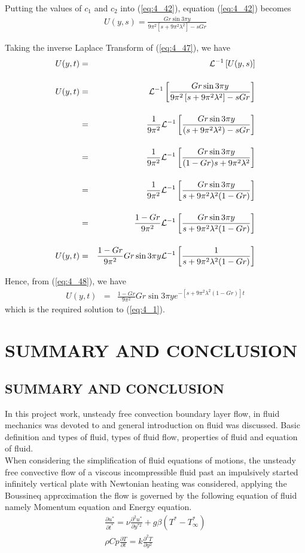 \documentclass[11pt]{report}
\newcommand{\spn}[1]{\\[#1cm]}
\newcommand{\refn}[1]{(\ref{#1})}
\newcommand{\refx}[1]{\refn{eq:#1}}
\newcommand{\NI}{\noindent}
\newcommand{\Laplace}{\mathcal{L}}
\newcommand{\InverseL}[1]{\Laplace^{-1}\left[#1\right]}
\newcommand{\Lpt}{Laplace Transform }
\begin{document}
	\NI Putting the values of $c_1$ and $c_2$ into \refx{4_42}, equation \refx{4_42} becomes
	\begin{eqnarray}
		U(y,s) = \frac{Gr\sin3\pi y}{9\pi^2\left[s+9\pi^2\lambda^2\right]-sGr}\label{eq:4_47}
	\end{eqnarray}
	
	\NI Taking the inverse \Lpt of \refx{4_47}, we have
	\begin{eqnarray}
		U(y,t) &=& \InverseL{U(y,s)}\notag\spn{0.4}
		U(y,t) &=& \InverseL{\frac{Gr\sin3\pi y}{9\pi^2\left[s+9\pi^2\lambda^2\right]-sGr}}\notag\spn{0.4}
		&=& \frac{1}{9\pi^2}\InverseL{\frac{Gr\sin3\pi y}{(s+9\pi^2\lambda^2) - sGr}}\notag\spn{0.4}
		&=&\frac{1}{9\pi^2}\InverseL{\frac{Gr\sin3\pi y}{(1-Gr)s + 9\pi^2\lambda^2}}\notag\spn{0.4}
		&=& \frac{1}{9\pi^2}\InverseL{\frac{Gr\sin3\pi y}{s+ 9\pi^2\lambda^2(1-Gr)}}\notag\spn{0.4}
		&=& \frac{1-Gr}{9\pi^2}\InverseL{\frac{Gr\sin3\pi y}{s+ 9\pi^2\lambda^2(1-Gr)}}\notag\spn{0.4}
		U(y,t) &=& \frac{1-Gr}{9\pi^2}Gr\sin3\pi y\InverseL{\frac{1}{s+ 9\pi^2\lambda^2(1-Gr)}}\label{eq:4_48}
	\end{eqnarray}
	
	\NI Hence, from \refx{4_48}, we have
	\begin{eqnarray}
		U(y,t) &=& \frac{1-Gr}{9\pi^2}Gr\sin3\pi ye^{-\left[s+ 9\pi^2\lambda^2(1-Gr)\right]t}\label{eq:4_49}
	\end{eqnarray}
	which is the required solution to \refx{4_1}.
	

	\chapter{SUMMARY AND CONCLUSION}
	
	\section{SUMMARY AND CONCLUSION}
	In this project work, unsteady free convection boundary layer flow, in fluid mechanics was devoted to and general introduction on fluid was discussed. Basic definition and types of fluid, types of fluid flow, properties of fluid and equation of fluid.\\
	
	\NI When considering the simplification of fluid equations of motions, the unsteady free convective flow of a viscous incompressible fluid past an impulsively started infinitely vertical plate with Newtonian heating was considered, applying the Boussineq approximation the flow is governed by the following equation of fluid namely Momentum equation and Energy equation.
	\begin{gather*}
		\frac{\partial u^*}{\partial t^*} = \nu\frac{\partial^2 u^*}{\partial y^{*2}} + g\beta(T^* - T^*_\infty)\spn{0.5}
		\rho Cp\frac{\partial T}{\partial t} = k\frac{\partial^2 T}{\partial y^2}
	\end{gather*}
	
\end{document}

